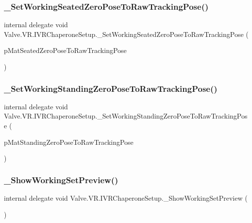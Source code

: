 \subsubsection{\texorpdfstring{\_SetWorkingSeatedZeroPoseToRawTrackingPose()}{\_SetWorkingSeatedZeroPoseToRawTrackingPose()}}
{\footnotesize\ttfamily internal delegate void Valve.\+V\+R.\+I\+V\+R\+Chaperone\+Setup.\+\_\+\+Set\+Working\+Seated\+Zero\+Pose\+To\+Raw\+Tracking\+Pose (\begin{DoxyParamCaption}\item[{ref \mbox{\hyperlink{struct_valve_1_1_v_r_1_1_hmd_matrix34__t}{Hmd\+Matrix34\+\_\+t}}}]{p\+Mat\+Seated\+Zero\+Pose\+To\+Raw\+Tracking\+Pose }\end{DoxyParamCaption})}

\mbox{\label{struct_valve_1_1_v_r_1_1_i_v_r_chaperone_setup_a7cc1138b7593b23c7ac311cb1ecacb1f}} 
\subsubsection{\texorpdfstring{\_SetWorkingStandingZeroPoseToRawTrackingPose()}{\_SetWorkingStandingZeroPoseToRawTrackingPose()}}
{\footnotesize\ttfamily internal delegate void Valve.\+V\+R.\+I\+V\+R\+Chaperone\+Setup.\+\_\+\+Set\+Working\+Standing\+Zero\+Pose\+To\+Raw\+Tracking\+Pose (\begin{DoxyParamCaption}\item[{ref \mbox{\hyperlink{struct_valve_1_1_v_r_1_1_hmd_matrix34__t}{Hmd\+Matrix34\+\_\+t}}}]{p\+Mat\+Standing\+Zero\+Pose\+To\+Raw\+Tracking\+Pose }\end{DoxyParamCaption})}

\mbox{\label{struct_valve_1_1_v_r_1_1_i_v_r_chaperone_setup_a3bfcf023d5b22e50ec327fd4862751a1}} 
\subsubsection{\texorpdfstring{\_ShowWorkingSetPreview()}{\_ShowWorkingSetPreview()}}
{\footnotesize\ttfamily internal delegate void Valve.\+V\+R.\+I\+V\+R\+Chaperone\+Setup.\+\_\+\+Show\+Working\+Set\+Preview (\begin{DoxyParamCaption}{ }\end{DoxyParamCaption})}



